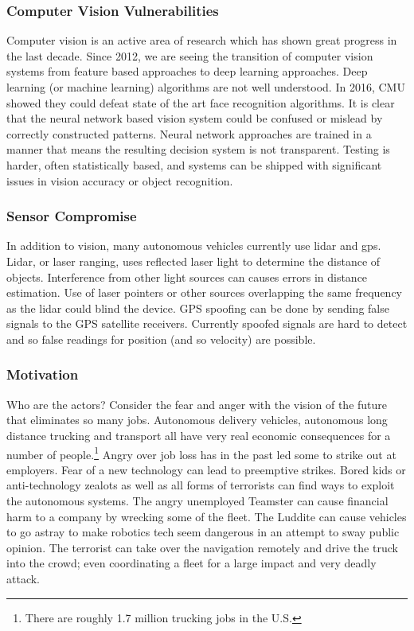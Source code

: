 \hypertarget{computer-vision-vulnerabilities}{%
\subsubsection{Computer Vision
Vulnerabilities}\label{computer-vision-vulnerabilities}}

Computer vision is an active area of research which has shown great
progress in the last decade. Since 2012, we are seeing the transition of
computer vision systems from feature based approaches to deep learning
approaches. Deep learning (or machine learning) algorithms are not well
understood. In 2016, CMU showed they could defeat state of the art face
recognition algorithms. It is clear that the neural network based vision
system could be confused or mislead by correctly constructed patterns.
Neural network approaches are trained in a manner that means the
resulting decision system is not transparent. Testing is harder, often
statistically based, and systems can be shipped with significant issues
in vision accuracy or object recognition.

\hypertarget{sensor-compromise}{%
\subsubsection{Sensor Compromise}\label{sensor-compromise}}

In addition to vision, many autonomous vehicles currently use lidar and
gps. Lidar, or laser ranging, uses reflected laser light to determine
the distance of objects. Interference from other light sources can
causes errors in distance estimation. Use of laser pointers or other
sources overlapping the same frequency as the lidar could blind the
device. GPS spoofing can be done by sending false signals to the GPS
satellite receivers. Currently spoofed signals are hard to detect and so
false readings for position (and so velocity) are possible.

\hypertarget{motivation}{%
\subsubsection{Motivation}\label{motivation}}

Who are the actors? Consider the fear and anger with the vision of the
future that eliminates so many jobs. Autonomous delivery vehicles,
autonomous long distance trucking and transport all have very real
economic consequences for a number of people.\footnote{There are roughly
  1.7 million trucking jobs in the U.S.} Angry over job loss has in the
past led some to strike out at employers. Fear of a new technology can
lead to preemptive strikes. Bored kids or anti-technology zealots as
well as all forms of terrorists can find ways to exploit the autonomous
systems. The angry unemployed Teamster can cause financial harm to a
company by wrecking some of the fleet. The Luddite can cause vehicles to
go astray to make robotics tech seem dangerous in an attempt to sway
public opinion. The terrorist can take over the navigation remotely and
drive the truck into the crowd; even coordinating a fleet for a large
impact and very deadly attack.

